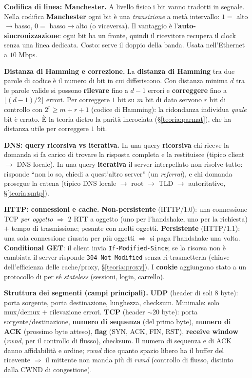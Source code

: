 \documentclass[11pt,a4paper]{report}
\begin{document}
\textbf{Codifica di linea: Manchester.} A livello fisico i bit vanno tradotti in
segnale. Nella codifica \textbf{Manchester} ogni bit è una \emph{transizione} a
metà intervallo: $1=$ alto$\to$basso, $0=$ basso$\to$alto (o viceversa). Il
vantaggio è l'\textbf{auto-sincronizzazione}: ogni bit ha un fronte, quindi il
ricevitore recupera il clock senza una linea dedicata. Costo: serve il doppio
della banda. Usata nell'Ethernet a $10$ Mbps.

\textbf{Distanza di Hamming e correzione.} La \textbf{distanza di Hamming} tra due
parole di codice è il numero di bit in cui differiscono. Con distanza minima $d$
tra le parole valide si possono \textbf{rilevare} fino a $d-1$ errori e
\textbf{correggere} fino a $\lfloor (d-1)/2\rfloor$ errori. Per correggere $1$ bit
su $m$ bit di dato servono $r$ bit di controllo con $2^r\ge m+r+1$ (codice di
Hamming): la ridondanza individua \emph{quale} bit è errato. È la teoria dietro la
parità incrociata (\S\ref{teoria:parmat}), che ha distanza utile per correggere
$1$ bit.

\textbf{DNS: query ricorsiva vs iterativa.} In una query \textbf{ricorsiva} chi
riceve la domanda si fa carico di trovare la risposta completa e la restituisce
(tipico client $\to$ DNS locale). In una query \textbf{iterativa} il server
interpellato non risolve tutto: risponde ``non lo so, chiedi a quest'altro
server'' (un \emph{referral}), e chi domanda prosegue la catena (tipico DNS locale
$\to$ root $\to$ TLD $\to$ autoritativo, \S\ref{teoria:smtp}).

\textbf{HTTP: connessioni e cache.} \textbf{Non-persistente} (HTTP/1.0): una
connessione TCP \emph{per oggetto} $\Rightarrow$ $2$ RTT a oggetto (uno per
l'handshake, uno per la richiesta) $+$ tempo di trasmissione; pesante con molti
oggetti. \textbf{Persistente} (HTTP/1.1): una sola connessione riusata per più
oggetti $\Rightarrow$ si paga l'handshake una volta. \textbf{Conditional GET}: il
client invia \texttt{If-Modified-Since}; se la risorsa non è cambiata il server
risponde \texttt{304 Not Modified} senza ri-trasmetterla (chiave dell'efficienza
delle cache/proxy, \S\ref{teoria:proxy}). I \textbf{cookie} aggiungono stato a un
protocollo di per sé \emph{stateless} (sessioni, login, carrello).

\textbf{Struttura dei segmenti (campi principali).} \textbf{UDP} (header di soli
$8$ byte): porta sorgente, porta destinazione, lunghezza, checksum. Minimale: solo
mux/demux $+$ rilevazione errori. \textbf{TCP} (header $\sim20$ byte): porta
sorgente/destinazione, \textbf{numero di sequenza} (del primo byte), \textbf{numero
di ACK} (prossimo byte atteso), \textbf{flag} (SYN, ACK, FIN, RST), \textbf{receive
window} (\emph{rwnd}, per il controllo di flusso), checksum. Il numero di sequenza
e di ACK danno affidabilità e ordine; \emph{rwnd} dice quanto spazio libero ha il
buffer del ricevente $\Rightarrow$ il mittente non manda più di \emph{rwnd}
(controllo di flusso, distinto dalla CWND di congestione).
\end{document}

